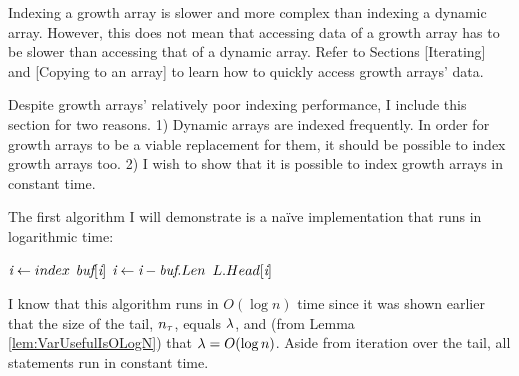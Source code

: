 \HdrGrowthArrayImpl

Indexing a growth array is slower and more complex than indexing a dynamic array. However, this does not mean that accessing data of a growth array has to be slower than accessing that of a dynamic array. Refer to Sections [Iterating] and [Copying to an array] to learn how to quickly access growth arrays' data.

Despite growth arrays' relatively poor indexing performance, I include this section for two reasons. 1) Dynamic arrays are indexed frequently. In order for growth arrays to be a viable replacement for them, it should be possible to index growth arrays too. 2) I wish to show that it is possible to index growth arrays in constant time.

The first algorithm I will demonstrate is a na\"{i}ve implementation that runs in logarithmic time:

\begin{algorithm}
	\begin{algorithmic}
			\State $\textit{i} \gets index$
					\State \Return $\textit{buf}[\textit{i}]$
				\EndIf
				\State $\textit{i} \gets \textit{i} - \textit{buf}.Len$
			\EndFor
			\State \Return $L.Head[\textit{i}]$
		\EndFunction
	\end{algorithmic}
\end{algorithm}

I know that this algorithm runs in $O(\log n)$ time since it was shown earlier that the size of the tail, $n_\tau$, equals $\lambda$, and (from Lemma \ref{lem:VarUsefulIsOLogN}) that $\lambda = O(\log n)$. Aside from iteration over the tail, all statements run in constant time.

